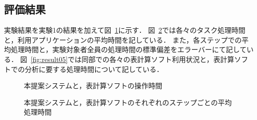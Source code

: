 \documentclass[sotsuron]{kuee}
\begin{document}
		\subsection{評価結果}
			実験結果を実験1の結果を加えて図~\ref{fig:result03}に示す．
			図~\ref{fig:result04}では各々のタスク処理時間と，利用アプリケーションの平均時間を記している．
			また，各ステップでの平均処理時間と，実験対象者全員の処理時間の標準偏差をエラーバーにて記している．
			図~\ref{fig:result05}では同部での各々の表計算ソフト利用状況と，表計算ソフトでの分析に要する処理時間について記している．
			\begin{figure}
				\begin{center}
				\end{center}
				\caption{本提案システムと，表計算ソフトの操作時間}
		  		\label{fig:result03}
			\end{figure}
			\begin{figure}
				\begin{center}
				\end{center}
				\caption{本提案システムと，表計算ソフトのそれぞれのステップごとの平均処理時間}
		  		\label{fig:result04}
			\end{figure}
\end{document}
